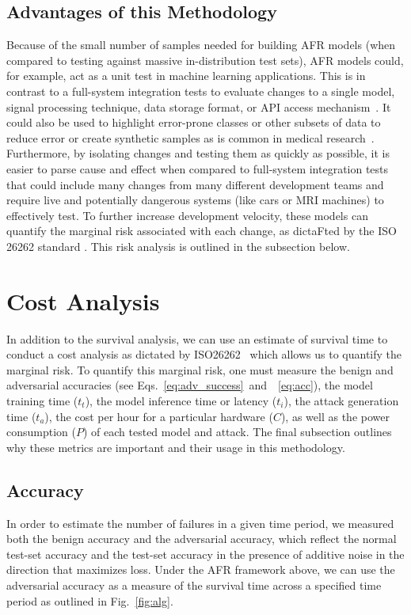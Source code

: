 \documentclass[conference]{IEEEtran}
\begin{document}
\subsection{Advantages of this Methodology}
\label{advantages}
Because of the small number of samples needed for building AFR models (when compared to testing against massive in-distribution test sets), AFR models could, for example, act as a unit test in machine learning applications. This is in contrast to a full-system integration tests to evaluate changes to a single model, signal processing technique, data storage format, or API access mechanism~\cite{schmoor2000sample,lachin1981introduction}. It could also be used to highlight error-prone classes or other subsets of data to reduce error or create synthetic samples as is common in medical research~\cite{kleinbaum1996survival}. Furthermore, by isolating changes and testing them as quickly as possible, it is  easier to parse cause and effect when compared to full-system integration tests that could include many changes from many different development teams and require live and potentially dangerous systems (like cars or MRI machines) to effectively test. To further increase development velocity, these models can quantify the marginal risk associated with each change, as dictaFted by the ISO 26262 standard \cite{iso26262}. This risk analysis is outlined in the subsection below.

\section{Cost Analysis}
\label{cost}
In addition to the survival analysis, we can use an estimate of survival time to conduct a cost analysis as dictated by ISO26262~\cite{iso26262} which allows us to quantify the marginal risk. To quantify this marginal risk, one must measure the benign and adversarial accuracies (see Eqs.~\ref{eq:adv_success}~and~~\ref{eq:acc}), the model training time ($t_{t}$), the model inference time or latency ($t_{i}$), the attack generation time ($t_{a}$), the cost per hour for a particular hardware ($C$), as well as the power consumption ($P$) of each tested model and attack. The final subsection outlines why these metrics are important and their usage in this methodology.

\subsection{Accuracy}
In order to estimate the number of failures in a given time period, we measured both the benign accuracy and the adversarial accuracy, which reflect the normal test-set accuracy and the test-set accuracy in the presence of additive noise in the direction that maximizes loss. Under the AFR framework above, we can use the adversarial accuracy as a measure of the survival time across a specified time period as outlined in Fig.~\ref{fig:alg}.
\end{document}
